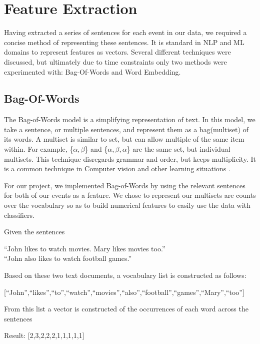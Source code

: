 \documentclass[bsc,frontabs,twoside,singlespacing,parskip,deptreport]{infthesis}     %
\begin{document}
\section{Feature Extraction}\label{sec:representation}
Having extracted a series of sentences for each event in our data, we required a concise method
of representing these sentences. It is standard in NLP and ML domains to represent features as vectors.
Several different techniques were discussed, but ultimately due to time constraints only two methods were
experimented with: Bag-Of-Words and Word Embedding.
\subsection{Bag-Of-Words}
The Bag-of-Words model is a simplifying representation of text.
In this model, we take a sentence, or multiple sentences, and represent them as a bag(multiset) of its words.
A multiset is similar to set, but can allow multiple of the same item within.
For example, \{$\alpha,\beta$\} and \{$\alpha,\beta,\alpha$\} are the same set, but individual multisets.
This technique disregards grammar and order, but keeps multiplicity. It is a common technique in Computer vision
and other learning situations \cite{sivic2009efficient}.

For our project, we implemented Bag-of-Words by using the relevant sentences for both of our events as a feature.
We chose to represent our multisets are counts over the vocabulary so as to build numerical features to easily
use the data with classifiers.
\begin{tcolorbox}[width=\textwidth,
                  interior hidden,
                  boxsep=10pt,
                  left=0pt,
                  right=0pt,
                  top=2pt,
                  ]%
  Given the sentences \vspace{0.5em}\\
  \begin{center}``John likes to watch movies. Mary likes movies too.''\\
  ``John also likes to watch football games.''\vspace{1em}\\
   \end{center}
    Based on these two text documents, a vocabulary list is constructed as follows:\vspace{1em}\\
    \begin{center}
  [``John'',``likes'',``to'',``watch'',``movies'',``also'',``football'',``games'',``Mary'',``too'']\vspace{1em}\\
\end{center}
    From this list a vector is constructed of the occurrences
    of each word across the sentences\vspace{1em}\\
 \begin{center} 
  Result: [2,3,2,2,2,1,1,1,1,1]
\end{center}
\end{tcolorbox}
\end{document}
